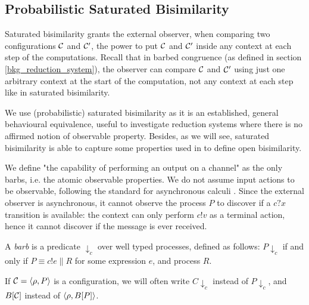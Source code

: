 \subsection{Probabilistic Saturated Bisimilarity}

Saturated bisimilarity \cite{bonchiGeneralTheoryBarbs2014} grants the external observer, when comparing two configurations $\mathcal{C}$ and $\mathcal{C}'$, the power to put $\mathcal{C}$ and $\mathcal{C}'$ inside any context at each step of the computations. Recall that in barbed congruence (as defined in section \ref{bkg_reduction_system}), the observer can compare $\mathcal{C}$ and $\mathcal{C}'$ using just one arbitrary context at the start of the computation, not any context at each step like in saturated bisimilarity.

We use (probabilistic) saturated bisimilarity as it is an established, general behavioural equivalence, useful to investigate reduction systems where there is no affirmed notion of observable property. Besides, as we will see, saturated bisimilarity is able to capture some properties used in \cite{dengOpenBisimulationQuantum2012} to define open bisimilarity.


We define "the capability of performing an output on a channel" as the only barbs, i.e. the atomic observable properties. We do not assume input actions to be observable, following the standard for asynchronous calculi \cite{amadioBisimulationsAsynchronousPcalculus1998}. Since the external observer is asynchronous, it cannot observe the process $P$ to discover if a $c?x$ transition is available: the context can only perform $c!v$ as a terminal action, hence it cannot discover if  the message is ever received.

\begin{definition}[Barb]
	A \emph{barb} is a predicate $\downarrow_{c}$ over well typed processes, defined as follows: $P \downarrow_{c}$ if and only if $P \equiv c!e \parallel R$ for some expression $e$, and process $R$.
\end{definition}


If $\mathcal{C} = \langle\rho, P\rangle$ is a configuration, we will often write $C\downarrow_c$ instead of $P\downarrow_c$, and $B[\mathcal{C}]$ instead of $\langle\rho, B[P]\rangle$.

